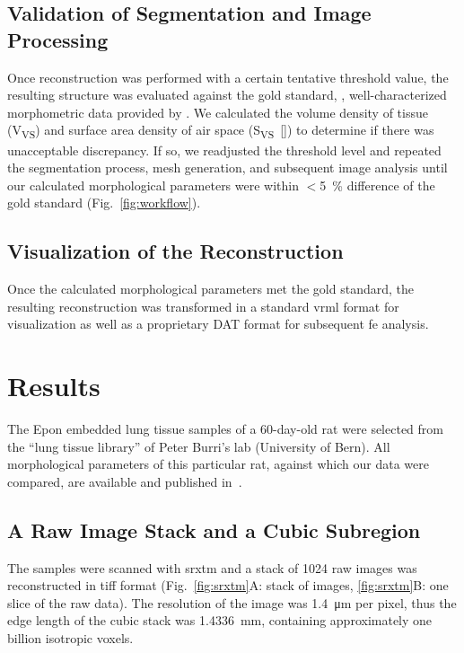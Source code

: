 \subsection[Validation of Segmentation]{Validation of Segmentation and Image Processing}
Once \threed reconstruction was performed with a certain tentative threshold value, the resulting \threed structure was evaluated against the gold standard, \ie, well-characterized morphometric data provided by \citet{Tschanz2003}. We calculated the volume density of tissue (V\textsubscript{VS}) and surface area density of air space (S\textsubscript{VS}~[\centimetresquared\per\centimetrecubed]) to determine if there was unacceptable discrepancy. If so, we readjusted the threshold level and repeated the segmentation process, mesh generation, and subsequent image analysis until our calculated morphological parameters were within $<$\SI{5}{\percent} difference of the gold standard (Fig.~\ref{fig:workflow}).

\subsection[Visualization of the Reconstruction]{Visualization of the \threed Reconstruction}
Once the calculated morphological parameters met the gold standard, the resulting \threed reconstruction was transformed in a standard \acs{vrml} format for visualization as well as a proprietary DAT format for subsequent \ac{fe} analysis.

\section{Results}
The Epon embedded lung tissue samples of a 60-day-old rat were selected from the ``lung tissue library'' of Peter Burri's lab (University of Bern). All morphological parameters of this particular rat, against which our data were compared, are available and published in~\citet{Tschanz2003}.

\subsection{A Raw Image Stack and a Cubic Subregion}
The samples were scanned with \ac{srxtm} and a stack of 1024 raw images was reconstructed in tiff format (Fig.~\ref{fig:srxtm}A: stack of images, \ref{fig:srxtm}B: one slice of the raw data). The resolution of the image was \SI{1.4}{\micro\meter} per pixel, thus the edge length of the cubic stack was \SI{1.4336}{\milli\meter}, containing approximately one billion isotropic voxels.

